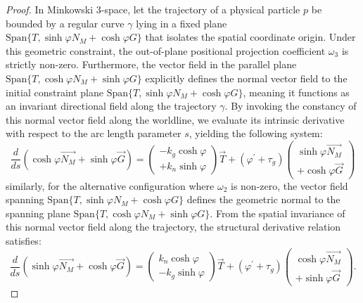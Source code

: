 \documentclass[reqno]{amsart}
\theoremstyle{plain}
\numberwithin{equation}{section}
\begin{document}
\begin{proof}
In Minkowski 3-space, let the trajectory of a physical particle $p$ be bounded by a regular curve $\gamma$ lying in a fixed plane $\text{Span}\{T, \sinh \varphi N_{M} + \cosh \varphi G\}$ that isolates the spatial coordinate origin. Under this geometric constraint, the out-of-plane positional projection coefficient $\omega_{3}$ is strictly non-zero. Furthermore, the vector field in the parallel plane $\text{Span}\{T, \cosh \varphi N_{M} + \sinh \varphi G\}$ explicitly defines the normal vector field to the initial constraint plane $\text{Span}\{T, \sinh \varphi N_{M} + \cosh \varphi G\}$, meaning it functions as an invariant directional field along the trajectory $\gamma$. By invoking the constancy of this normal vector field along the worldline, we evaluate its intrinsic derivative with respect to the arc length parameter $s$, yielding the following system:
\begin{equation}
\frac{d}{ds}\left( \cosh \varphi \overrightarrow{N_{M}}+\sinh \varphi 
\overrightarrow{G}\right) =\left( 
\begin{array}{c}
-k_{g}\cosh \varphi \\ 
+k_{n}\sinh \varphi%
\end{array}%
\right) \overrightarrow{T}+(\varphi ^{\prime }+\tau _{g})\left( 
\begin{array}{c}
\sinh \varphi \overrightarrow{N_{M}} \\ 
+\cosh \varphi \overrightarrow{G}%
\end{array}%
\right)  \tag{3.18}
\end{equation}%
similarly, for the alternative configuration where $\omega_{2}$ is non-zero, the vector field spanning $\text{Span}\{T, \sinh \varphi N_{M} + \cosh \varphi G\}$ defines the geometric normal to the spanning plane $\text{Span}\{T, \cosh \varphi N_{M} + \sinh \varphi G\}$. From the spatial invariance of this normal vector field along the trajectory, the structural derivative relation satisfies:
\begin{equation}
\frac{d}{ds}\left( \sinh \varphi \overrightarrow{N_{M}}+\cosh \varphi 
\overrightarrow{G}\right) =\left( 
\begin{array}{c}
k_{n}\cosh \varphi \\ 
-k_{g}\sinh \varphi%
\end{array}%
\right) \overrightarrow{T}+(\varphi ^{\prime }+\tau _{g})\left( 
\begin{array}{c}
\cosh \varphi \overrightarrow{N_{M}} \\ 
+\sinh \varphi \overrightarrow{G}%
\end{array}%
\right) .  \tag{3.19}
\end{equation}


\end{proof}
\end{document}
